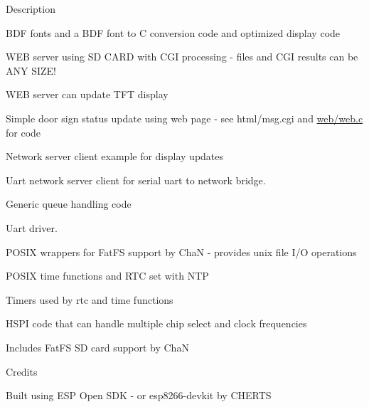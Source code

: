 \begin{DoxyParagraph}{Description}
\begin{DoxyItemize}
\begin{DoxyItemize}
\item B\+DF fonts and a B\+DF font to C conversion code and optimized display code
\item W\+EB server using SD C\+A\+RD with C\+GI processing -\/ files and C\+GI results can be A\+NY S\+I\+Z\+E!
\item W\+EB server can update T\+FT display
\begin{DoxyItemize}
\item Simple door sign status update using web page -\/ see html/msg.\+cgi and \hyperlink{web_8c}{web/web.\+c} for code
\end{DoxyItemize}
\item Network server client example for display updates
\item Uart network server client for serial uart to network bridge.
\item Generic queue handling code
\item Uart driver.
\item P\+O\+S\+IX wrappers for Fat\+FS support by ChaN -\/ provides unix file I/O operations
\item P\+O\+S\+IX time functions and R\+TC set with N\+TP
\item Timers used by rtc and time functions
\item H\+S\+PI code that can handle multiple chip select and clock frequencies
\end{DoxyItemize}
\item Includes Fat\+FS SD card support by ChaN
\end{DoxyItemize}
\end{DoxyParagraph}
\begin{DoxyParagraph}{Credits}

\begin{DoxyItemize}
\item Built using E\+SP Open S\+DK -\/ or esp8266-\/devkit by C\+H\+E\+R\+TS 
\end{DoxyItemize}
\end{DoxyParagraph}
